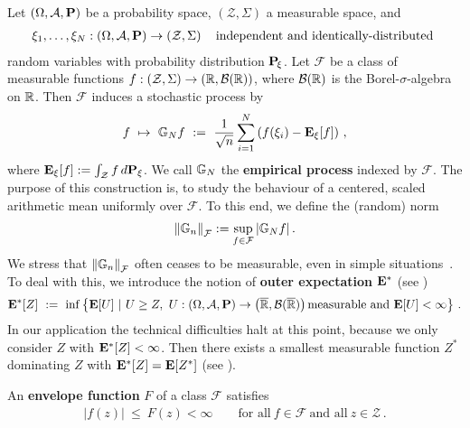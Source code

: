 Let 
$
  \left( 
    \Omega,
    \mathcal{A},
    \P
  \right)
$
be a probability space,
$
  \left( 
    \mathcal{Z},
    \Sigma
  \right)
$
a measurable space, and 
\begin{gather*}
  \xi_1,\ldots,\xi_N
  :
  \left( 
    \Omega,
    \mathcal{A},
    \P
  \right)
  \to
  \left( 
    \mathcal{Z},
    \Sigma
  \right)
  \quad
  \text{independent and identically-distributed
  }
\end{gather*}
random variables
with probability distribution $\P_{\!\xi}$.
Let $\mathcal{F}$ be a class of measurable functions 
$
  f:
  \left( 
    \mathcal{Z},
    \Sigma
  \right)
    \to
  \left( 
    \R,
    \mathcal{B}(\R)
  \right)
$, where
$
    \mathcal{B}(\R)
$
is the Borel-$\sigma$-algebra on $\R$.
Then $\mathcal{F}$
induces a stochastic process by
\begin{gather}
  f
  \ 
  \mapsto
  \ 
  \G_N f 
  \ 
  :=
  \ 
  \frac{1}{\sqrt{n}}
  \sum_{i=1}^{N} 
  \left(
    f(\xi_i)
    -
    \E_\xi[f]
  \right)
  \,,
\end{gather}
where
$
    \E_\xi[f]
    :=
    \int_\mathcal{Z}
    f
    \,
    d\P_\xi
$.
We call
$\G_N$ the  \textbf{empirical process} indexed by $\mathcal{F}$.
The purpose of this construction is, to study the behaviour of a centered, scaled arithmetic mean uniformly over $\mathcal{F}$.
To this end, we define the (random) norm
\begin{gather}
  \norm{\G_n}_\mathcal{F}
  :=
  \sup_
        { f \in \mathcal{F}}
        \left|
          \G_N f
        \right|
        .
\end{gather}
We stress that 
$
  \norm{\G_n}_\mathcal{F}
$
often ceases to be measurable, even in simple situations~\cite[page 3]{vaart2013}.
To deal with this, we introduce the notion of \textbf{outer expectation} $\E^*$ (see \cite[page~6]{vaart2013})
\begin{gather*}
  \E^*[Z]
  \ 
  :=
  \ 
    \inf
  \left\{ 
    \E[U]
  \ 
  \lvert
  \ 
    U\ge Z,
    \ 
    U:
  \left( 
    \Omega,
    \mathcal{A},
    \P
  \right)
  \to 
  \left( 
    \overline{\R},
    \mathcal{B}(\overline{\R})
  \right)
  \text{measurable and}
  \ 
  \E[U]<\infty
  \right\}
  \,.
\end{gather*}
In our application the technical difficulties halt at this point, because we only consider $Z$ with $\E^*[Z]<\infty$. Then there exists a smallest measurable function $Z^*$ dominating $Z$ with
$\E^*[Z]=\E[Z^*]$ (see \cite[Lemma~1.2.1]{vaart2013}).

An \textbf{envelope function} $F$ of a class $\mathcal{F}$ satisfies 
\begin{align*}
|f(z)|
\ 
\le
\ 
F(z)< \infty 
\qquad
\text{for all}\ 
f\in\mathcal{F}
\ \text{and all}\ 
z\in\mathcal{Z}
\,.
\end{align*}

